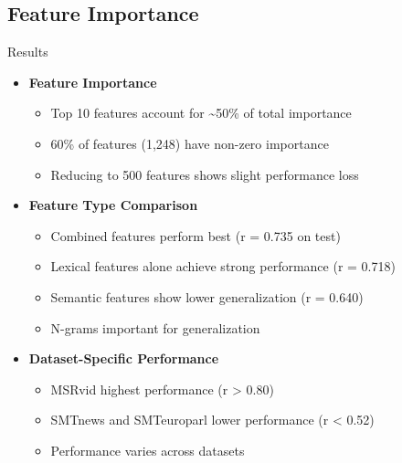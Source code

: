 \documentclass{beamer}
\begin{document}
\subsection{Feature Importance}
\begin{frame}{Results}
    \begin{itemize}
        \item \textbf{Feature Importance}
        \begin{itemize}
            \item Top 10 features account for \textasciitilde{}50\% of total importance
            \item 60\% of features (1,248) have non-zero importance
            \item Reducing to 500 features shows slight performance loss
        \end{itemize}
        \item \textbf{Feature Type Comparison}
        \begin{itemize}
            \item Combined features perform best (r = 0.735 on test)
            \item Lexical features alone achieve strong performance (r = 0.718)
            \item Semantic features show lower generalization (r = 0.640)
            \item N-grams important for generalization
        \end{itemize}
        \item \textbf{Dataset-Specific Performance}
        \begin{itemize}
            \item MSRvid highest performance (r \textgreater{} 0.80)
            \item SMTnews and SMTeuroparl lower performance (r \textless{} 0.52)
            \item Performance varies across datasets
        \end{itemize}
    \end{itemize}
\end{frame}
\end{document}

